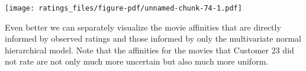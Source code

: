\documentclass[
  letterpaper,
  DIV=11,
  numbers=noendperiod]{scrartcl}
\newenvironment{Shaded}{\begin{snugshade}}{\end{snugshade}}
\newcommand{\AttributeTok}[1]{\textcolor[rgb]{0.40,0.45,0.13}{#1}}
\newcommand{\ControlFlowTok}[1]{\textcolor[rgb]{0.00,0.23,0.31}{#1}}
\newcommand{\DecValTok}[1]{\textcolor[rgb]{0.68,0.00,0.00}{#1}}
\newcommand{\FunctionTok}[1]{\textcolor[rgb]{0.28,0.35,0.67}{#1}}
\newcommand{\NormalTok}[1]{\textcolor[rgb]{0.00,0.23,0.31}{#1}}
\newcommand{\OtherTok}[1]{\textcolor[rgb]{0.00,0.23,0.31}{#1}}
\newcommand{\SpecialCharTok}[1]{\textcolor[rgb]{0.37,0.37,0.37}{#1}}
\newcommand{\StringTok}[1]{\textcolor[rgb]{0.13,0.47,0.30}{#1}}
\begin{document}
\begin{Shaded}
\end{Shaded}

\texttt{[image: ratings\_files/figure-pdf/unnamed-chunk-74-1.pdf]}

Even better we can separately visualize the movie affinities that are
directly informed by observed ratings and those informed by only the
multivariate normal hierarchical model. Note that the affinities for the
movies that Customer 23 did not rate are not only much more uncertain
but also much more uniform.
\end{document}
